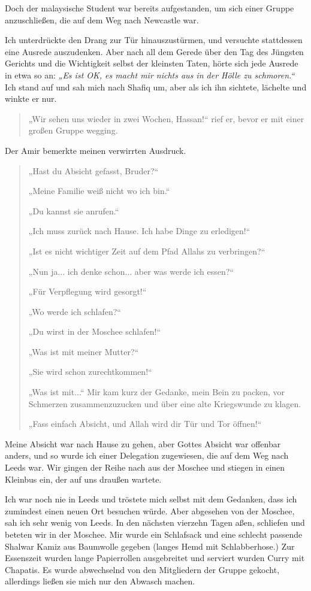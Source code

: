\documentclass[12pt]{memoir}
\begin{document}
Doch der malaysische Student war bereits aufgestanden,
um sich einer Gruppe anzuschließen, die auf dem Weg nach Newcastle war.

Ich unterdrückte den Drang zur Tür hinauszustürmen,
und versuchte stattdessen eine Ausrede auszudenken.
Aber nach all dem Gerede über den Tag des Jüngsten Gerichts
und die Wichtigkeit selbst der kleinsten Taten,
hörte sich jede Ausrede in etwa so an:
\emph{„Es ist OK, es macht mir nichts aus in der Hölle zu schmoren.“}
Ich stand auf und sah mich nach Shafiq um,
aber als ich ihn sichtete, lächelte und winkte er nur.

\begin{quote}
„Wir sehen uns wieder in zwei Wochen, Hassan!“ rief er,
bevor er mit einer großen Gruppe wegging.
\end{quote}

Der Amir bemerkte meinen verwirrten Ausdruck.

\begin{quote}
„Hast du Absicht gefasst, Bruder?“

„Meine Familie weiß nicht wo ich bin.“

„Du kannst sie anrufen.“

„Ich muss zurück nach Hause. Ich habe Dinge zu erledigen!“

„Ist es nicht wichtiger Zeit auf dem Pfad Allahs zu verbringen?“

„Nun ja... ich denke schon... aber was werde ich essen?“

„Für Verpflegung wird gesorgt!“

„Wo werde ich schlafen?“

„Du wirst in der Moschee schlafen!“

„Was ist mit meiner Mutter?“

„Sie wird schon zurechtkommen!“

„Was ist mit...“ Mir kam kurz der Gedanke, mein Bein zu packen,
vor Schmerzen zusammenzuzucken und über eine alte Kriegswunde zu klagen.

„Fass einfach Absicht, und Allah wird dir Tür und Tor öffnen!“
\end{quote}

Meine Absicht war nach Hause zu gehen, aber Gottes Absicht war offenbar anders,
und so wurde ich einer Delegation zugewiesen, die auf dem Weg nach Leeds war.
Wir gingen der Reihe nach aus der Moschee und stiegen in einen Kleinbus ein,
der auf uns draußen wartete.

Ich war noch nie in Leeds und tröstete mich selbst mit dem Gedanken,
dass ich zumindest einen neuen Ort besuchen würde.
Aber abgesehen von der Moschee, sah ich sehr wenig von Leeds.
In den nächsten vierzehn Tagen aßen, schliefen und beteten wir in der Moschee.
Mir wurde ein Schlafsack und eine schlecht passende Shalwar Kamiz
aus Baumwolle gegeben (langes Hemd mit Schlabberhose.)
Zur Essenszeit wurden lange Papierrollen ausgebreitet
und serviert wurden Curry mit Chapatis.
Es wurde abwechselnd von den Mitgliedern der Gruppe gekocht,
allerdings ließen sie mich nur den Abwasch machen.
\end{document}

